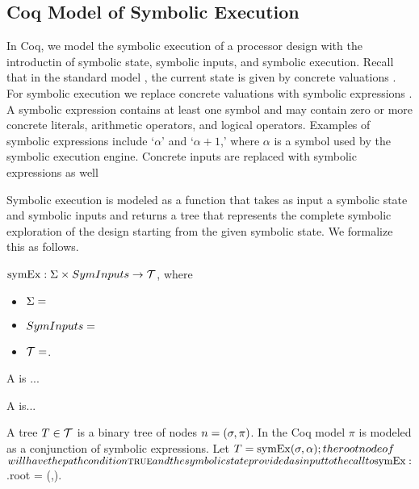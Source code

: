 




\subsection{Coq Model of Symbolic Execution}
In Coq, we model the symbolic execution of a processor design \hardwaredesign{}
with the introductin of symbolic state, symbolic inputs, and symbolic
execution. Recall that in the standard model \hardwaredesign{}, the current
state is given by concrete valuations . For symbolic execution we
replace concrete valuations  with symbolic expressions
\symexpression. A symbolic expression
\symexpression{} contains at least one symbol and may contain zero or more concrete
literals, arithmetic operators, and logical operators. Examples of
symbolic expressions include `$\alpha$' and `$\alpha + 1$,' where
$\alpha$ is a symbol used by the symbolic execution engine. Concrete inputs are
replaced with symbolic expressions as well 

Symbolic execution is modeled as a function that takes as input a symbolic state
and symbolic inputs and returns a tree that represents the complete symbolic
exploration of the design starting from the given symbolic state. We formalize
this as follows.

$\mathrm{symEx}: \Sigma \times SymInputs \rightarrow \mathcal{T}$, where
\begin{itemize}
\item $\Sigma = $
\item $SymInputs =$
\item $\mathcal{T} =$.
\end{itemize}

A \symstate{} is ...

A \syminput{} is...

A tree $T \in \mathcal{T}$ is a binary tree of nodes $n = (\sigma,\pi)$. In
the Coq model $\pi$ is modeled as a conjunction of symbolic expressions. Let
$T = \mathrm{symEx}(\sigma,\alpha); the root node of $\tree$ will have
the path condition \mathtt{\textsc{true}}{} and the symbolic state provided as input to
the call to \mathrm{symEx}{}: $\tree.root = (\symstate,\texttrue).

